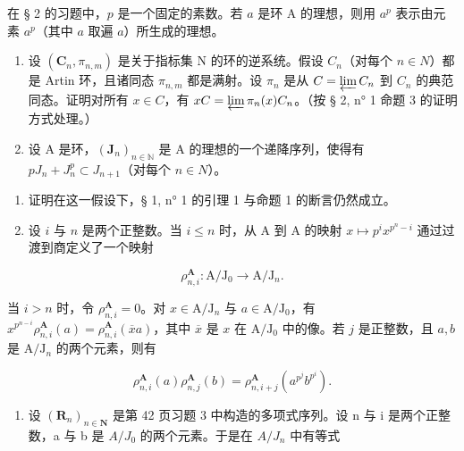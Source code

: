 
在 § 2 的习题中，\(p\) 是一个固定的素数。若 \(a\) 是环 A 的理想，则用 \(a^p\) 表示由元素 \(a^p\)（其中 \(a\) 取遍 \(a\)）所生成的理想。

\begin{enumerate}
\def\labelenumi{\arabic{enumi})}
\item
  设 \((\mathbf{C}_{n}, \pi_{n,m})\) 是关于指标集 N 的环的逆系统。假设 \(C_{n}\)（对每个 \(n \in N\)）都是 Artin 环，且诸同态 \(\pi_{n,m}\) 都是满射。设 \(\pi_{n}\) 是从 \(C = \varprojlim C_{n}\) 到 \(C_{n}\) 的典范同态。证明对所有 \(x \in C\)，有 \(xC = \varprojlim \pi_{n}(x) C_{n}\)。（按 § 2, n° 1 命题 3 的证明方式处理。）
\item
  设 A 是环，\((\mathbf{J}_{n})_{n\in\mathbb{N}}\) 是 A 的理想的一个递降序列，使得有 \(pJ_{n} + J_{n}^{p} \subset J_{n+1}\)（对每个 \(n \in N\)）。
\end{enumerate}

\begin{enumerate}
\def\labelenumi{\alph{enumi})}
\item
  证明在这一假设下，§ 1, n° 1 的引理 1 与命题 1 的断言仍然成立。
\item
  设 \(i\) 与 \(n\) 是两个正整数。当 \(i \leqslant n\) 时，从 A 到 A 的映射 \(x \mapsto p^i x^{p^n - i}\) 通过过渡到商定义了一个映射
\end{enumerate}

\[
\rho_ {n, i} ^ {\mathbf {A}}: \mathrm{A} / \mathrm{J} _ {0} \rightarrow \mathrm{A} / \mathrm{J} _ {n}.
\]

当 \(i > n\) 时，令 \(\rho_{n,i}^{\mathbf{A}} = 0\)。对 \(x \in \mathrm{A} / \mathrm{J}_n\) 与 \(a \in \mathrm{A} / \mathrm{J}_0\)，有 \(x^{p^{n - i}} \rho_{n,i}^{\mathbf{A}}(a) = \rho_{n,i}^{\mathbf{A}}(\overline{x} a)\)，其中 \(\overline{x}\) 是 \(x\) 在 \(\mathrm{A} / \mathrm{J}_0\) 中的像。若 \(j\) 是正整数，且 \(a, b\) 是 \(\mathrm{A} / \mathrm{J}_n\) 的两个元素，则有

\[
\rho_ {n, i} ^ {\mathbf {A}} (a) \rho_ {n, j} ^ {\mathbf {A}} (b) = \rho_ {n, i + j} ^ {\mathbf {A}} \left(a ^ {p ^ {j}} b ^ {p ^ {i}}\right).
\]

\begin{enumerate}
\def\labelenumi{\alph{enumi})}
\setcounter{enumi}{2}
\tightlist
\item
  设 \((\mathbf{R}_{n})_{n\in\mathbf{N}}\) 是第 42 页习题 3 中构造的多项式序列。设 n 与 i 是两个正整数，a 与 b 是 \(A/J_{0}\) 的两个元素。于是在 \(A/J_{n}\) 中有等式
\end{enumerate}

